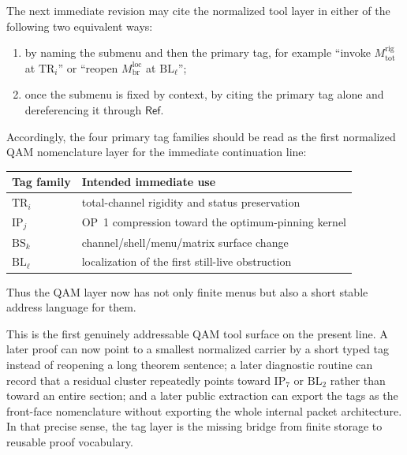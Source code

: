 \begin{corollary}
\label{cor:tag-first-citation-syntax-immediate-continuation-line}
The next immediate revision may cite the normalized tool layer in either of the following two equivalent ways:
\begin{enumerate}[leftmargin=2em]
 \item by naming the submenu and then the primary tag, for example ``invoke \(M^{\mathrm{rig}}_{\mathrm{tot}}\) at \(\mathrm{TR}_i\)'' or ``reopen \(M^{\mathrm{loc}}_{\mathrm{br}}\) at \(\mathrm{BL}_\ell\)'';
 \item once the submenu is fixed by context, by citing the primary tag alone and dereferencing it through \(\mathsf{Ref}\).
\end{enumerate}
Accordingly, the four primary tag families should be read as the first normalized QAM nomenclature layer for the immediate continuation line:
\begin{center}
\begin{tabular}{@{}ll@{}}
\toprule
Tag family & Intended immediate use \\
\midrule
\(\mathrm{TR}_i\) & total-channel rigidity and status preservation \\
\(\mathrm{IP}_j\) & OP~1 compression toward the optimum-pinning kernel \\
\(\mathrm{BS}_k\) & channel/shell/menu/matrix surface change \\
\(\mathrm{BL}_\ell\) & localization of the first still-live obstruction \\
\bottomrule
\end{tabular}
\end{center}
Thus the QAM layer now has not only finite menus but also a short stable address language for them.
\end{corollary}

\begin{remark}
\label{rem:what-tag-layer-buys-before-new-theorem}
This is the first genuinely addressable QAM tool surface on the present line. A later proof can now point to a smallest normalized carrier by a short typed tag instead of reopening a long theorem sentence; a later diagnostic routine can record that a residual cluster repeatedly points toward \(\mathrm{IP}_7\) or \(\mathrm{BL}_2\) rather than toward an entire section; and a later public extraction can export the tags as the front-face nomenclature without exporting the whole internal packet architecture. In that precise sense, the tag layer is the missing bridge from finite storage to reusable proof vocabulary.
\end{remark}



